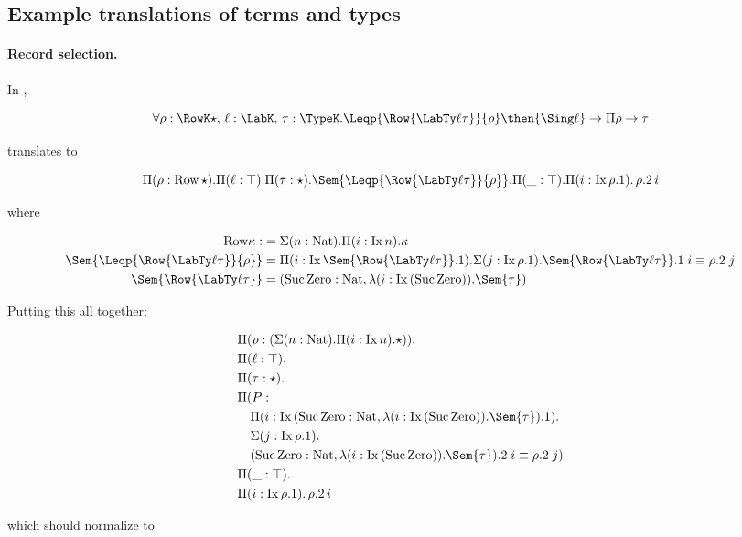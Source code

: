 \documentclass[12pt]{article}
\newcommand\Nat{\mathrm{Nat}}
\newcommand\Zero{\mathrm{Zero}}
\newcommand\Suc{\mathrm{Suc}}
\newcommand\Ix[1]{\mathrm{Ix} \, #1}
\begin{document}
\subsection{Example translations of \RO terms and types}

\paragraph{Record selection.}
In \RO,

\[
\forall \rho : \RowK \star, \, \ell : \LabK, \, \tau : \TypeK. \Leqp {\Row {\LabTy \ell \tau}} {\rho} \then {\Sing \ell} \to {\Pi \rho} \to \tau
\]

translates to

\[
\Pi (\rho : \mathrm{Row }\, \star). \Pi (\ell : \top). \Pi (\tau : \star). \Sem{\Leqp {\Row {\LabTy \ell \tau}} {\rho}}. \Pi (\_ : \top). \Pi (i : \Ix {\rho.1}). \, \rho.2 \, i 
\]

where

\begin{align*}
\mathrm{Row } \kappa :&= \Sigma (n : \Nat). \Pi (i : \Ix n). \kappa \\
\Sem{\Leqp {\Row {\LabTy \ell \tau}} {\rho}} &= \Pi (i : \Ix \Sem{\Row {\LabTy \ell \tau}}.1). \Sigma (j : \Ix {\rho.1}). \Sem{\Row {\LabTy \ell \tau}}.1 \; i \equiv {\rho}.2 \; j \\
\Sem{\Row {\LabTy \ell \tau}} &= (\Suc \, \Zero : \Nat, \lambda (i : \Ix {(\Suc \, \Zero)}). \Sem{\tau})
\end{align*}

Putting this all together:

\begin{align*}
&\Pi (\rho : (\Sigma (n : \Nat). \Pi (i : \Ix n). \star)).\\ 
&\Pi (\ell : \top). \\
&\Pi (\tau : \star). \\
&\Pi (P :      \\
&\quad \Pi (i : \Ix (\Suc \, \Zero : \Nat, \lambda (i : \Ix {(\Suc \, \Zero)}). \Sem{\tau}).1). \\
&\quad      \Sigma (j : \Ix {\rho.1}).  \\
&\quad      (\Suc \, \Zero : \Nat, \lambda (i : \Ix {(\Suc \, \Zero)}). \Sem{\tau}).2 \; i \equiv {\rho}.2 \; j) \\
&\Pi (\_ : \top). \\
&\Pi (i : \Ix {\rho.1}). \, \rho.2 \, i 
\end{align*}

which should normalize to
\end{document}
